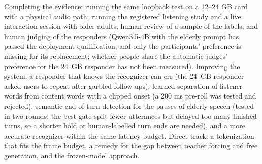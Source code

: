Completing the evidence: running the same loopback test on a 12--24 GB card with a
physical audio path; running the registered listening study and a live
interaction session with older adults; human review of a sample of the labels;
and human judging of the responders (Qwen3.5-4B with the elderly prompt has passed
the deployment qualification, and only the participants' preference is missing
for its replacement; whether people share the automatic judges' preference for the 24~GB
responder has not been measured). Improving the system: a responder that knows the
recognizer can err (the 24~GB responder asked users to repeat after garbled follow-ups);
learned separation of listener words from
content words with a clipped onset (a 200 ms pre-roll was tested and rejected),
semantic end-of-turn detection for the pauses of elderly speech (tested in two
rounds; the best gate split fewer utterances but delayed too many finished turns,
so a shorter hold or human-labelled turn ends are needed), and a more accurate recognizer within the same latency
budget. Direct track: a tokenization that fits the frame budget, a remedy for the
gap between teacher forcing and free generation, and the frozen-model approach.
